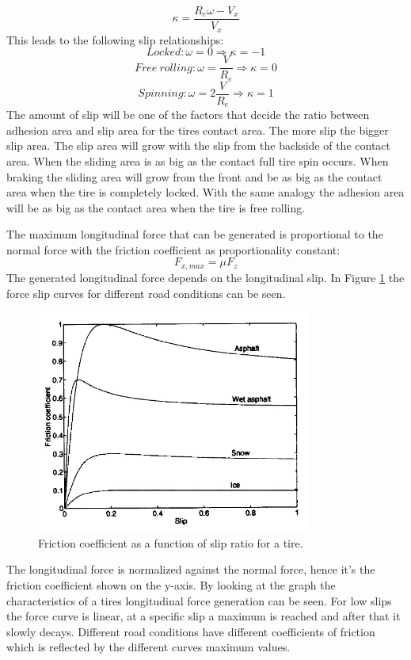 \begin{equation}
\kappa = \dfrac{R_{e}\omega-V_{x}}{V_{x}}
\label{eq:longslip}
\end{equation}
This leads to the following slip relationships:
\begin{equation}
Locked: \omega = 0 \Rightarrow \kappa = -1
\end{equation}
\begin{equation}
Free\: rolling: \omega = \frac{V}{R_{e}} \Rightarrow \kappa = 0
\end{equation}
\begin{equation}
Spinning: \omega = 2\frac{V}{R_{e}} \Rightarrow \kappa = 1
\end{equation}
The amount of slip will be one of the factors that decide the ratio between adhesion area and slip area for the tires contact area. The more slip the bigger slip area. The slip area will grow with the slip from the backside of the contact area. When the sliding area is as big as the contact full tire spin occurs. When braking the sliding area will grow from the front and be as big as the contact area when the tire is completely locked. With the same analogy the adhesion area will be as big as the contact area when the tire is free rolling. 

The maximum longitudinal force that can be generated is proportional to the normal force with the friction coefficient as proportionality constant:
\begin{equation}
F_{x,max} =  \mu F_{z}
\label{eq:fxmufz}
\end{equation}
The generated longitudinal force depends on the longitudinal slip. In Figure \ref{fric_slip} the force slip curves for different road conditions can be seen.
\begin{figure}[h]
	\centering
	\includegraphics[width=0.8\textwidth]{Pictures/fric_slip}
	\caption{Friction coefficient as a function of slip ratio for a tire. \cite{gustafsson1997}}
	\label{fric_slip}
\end{figure}
The longitudinal force is normalized against the normal force, hence it's the friction coefficient shown on the y-axis. By looking at the graph the characteristics of a tires longitudinal force generation can be seen. For low slips the force curve is linear, at a specific slip a maximum is reached and after that it slowly decays. Different road conditions have different coefficients of friction which is reflected by the different curves maximum values.

